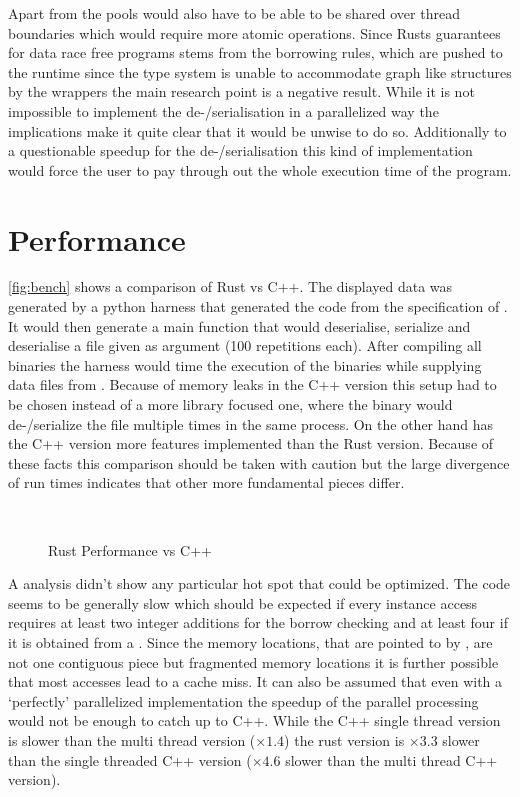 \documentclass[thesis]{subfiles}
\begin{document}
  Apart from \PtrT the pools would also have to be able to be shared over thread boundaries which would require more atomic operations.
  Since Rusts guarantees for data race free programs stems from the borrowing rules, which are pushed to the runtime since the type system is unable to accommodate graph like structures by the wrappers the main research point is a negative result.
  While it is not impossible to implement the de-/serialisation in a parallelized way the implications make it quite clear that it would be unwise to do so.
  Additionally to a questionable speedup for the de-/serialisation this kind of implementation would force the user to pay through out the whole execution time of the program.

\section{Performance}
  \autoref{fig:bench} shows a comparison of Rust vs C++.
  The displayed data was generated by a python harness that generated the code from the specification of \autocite{skill-llvm}.
  It would then generate a main function that would deserialise, serialize and deserialise a file given as argument (100 repetitions each).
  After compiling all binaries the harness would time the execution of the binaries while supplying data files from \autocite{skill-llvm}.
  Because of memory leaks in the C++ version this setup had to be chosen instead of a more library focused one, where the binary would de-/serialize the file multiple times in the same process.
  On the other hand has the C++ version more features implemented than the Rust version.
  Because of these facts this comparison should be taken with caution but the large divergence of run times indicates that other more fundamental pieces differ.

  \begin{figure}[ht]
    \centering
    ~\hfill
    
    \caption{Rust Performance vs C++}\label{fig:bench}
  \end{figure}

  A  analysis didn't show any particular hot spot that could be optimized.
  The code seems to be generally slow which should be expected if every \PtrT instance access requires at least two integer additions for the borrow checking and at least four if it is obtained from a \UserTypePool.
  Since the memory locations, that are pointed to by \PtrT, are not one contiguous piece but fragmented memory locations it is further possible that most accesses lead to a cache miss.
  It can also be assumed that even with a `perfectly' parallelized implementation the speedup of the parallel processing would not be enough to catch up to C++.
  While the C++ single thread version is slower than the multi thread version ($\times 1.4$) the rust version is $\times 3.3$ slower than the single threaded C++ version ($\times 4.6$ slower than the multi thread C++ version).
\end{document}

